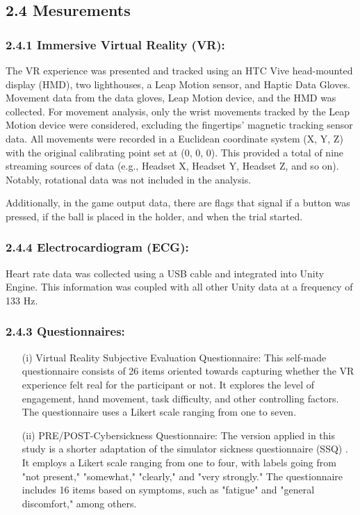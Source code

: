 \documentclass[12pt,oneside,openright]{report}
\begin{document}
\subsection*{2.4 Mesurements}
\subsubsection*{2.4.1 Immersive Virtual Reality (VR):}

The VR experience was presented and tracked using an HTC Vive head-mounted display (HMD), two lighthouses, a Leap Motion sensor, and Haptic Data Gloves. Movement data from the data gloves, Leap Motion device, and the HMD was collected. For movement analysis, only the wrist movements tracked by the Leap Motion device were considered, excluding the fingertips' magnetic tracking sensor data. All movements were recorded in a Euclidean coordinate system (X, Y, Z) with the original calibrating point set at (0, 0, 0). This provided a total of nine streaming sources of data (e.g., Headset X, Headset Y, Headset Z, and so on). Notably, rotational data was not included in the analysis.

Additionally, in the game output data, there are flags that signal if a button was pressed, if the ball is placed in the holder, and when the trial started.

\subsubsection*{2.4.4 Electrocardiogram (ECG):}

Heart rate data was collected using a USB cable and integrated into Unity Engine. This information was coupled with all other Unity data at a frequency of 133 Hz.

\subsubsection*{2.4.3 Questionnaires:}

\begin{enumerate}
\item[(i)] Virtual Reality Subjective Evaluation Questionnaire: This self-made questionnaire consists of 26 items oriented towards capturing whether the VR experience felt real for the participant or not. It explores the level of engagement, hand movement, task difficulty, and other controlling factors. The questionnaire uses a Likert scale ranging from one to seven.
\item[(ii)] PRE/POST-Cybersickness Questionnaire: The version applied in this study is a shorter adaptation of the simulator sickness questionnaire (SSQ) \parencite*{avpsy}. It employs a Likert scale ranging from one to four, with labels going from "not present," "somewhat," "clearly," and "very strongly." The questionnaire includes 16 items based on symptoms, such as "fatigue" and "general discomfort," among others.
\end{enumerate}
\end{document}
